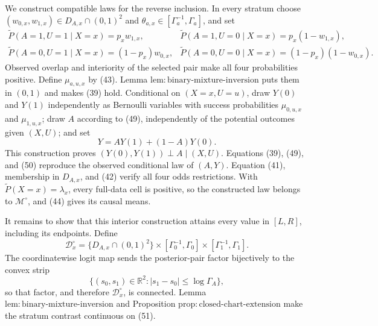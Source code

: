We construct compatible laws for the reverse inclusion.  In every stratum choose \((w_{0,x},w_{1,x})\in D_{A,x}\cap(0,1)^2\) and \(\theta_{a,x}\in[\Gamma_a^{-1},\Gamma_a]\), and set
\[
\begin{array}{ll}
 \widetilde P(A=1,U=1\mid X=x)=p_xw_{1,x},
 &\widetilde P(A=1,U=0\mid X=x)=p_x(1-w_{1,x}),\\
 \widetilde P(A=0,U=1\mid X=x)=(1-p_x)w_{0,x},
 &\widetilde P(A=0,U=0\mid X=x)=(1-p_x)(1-w_{0,x}).
\end{array}                                                             \tag{49}
\]
Observed overlap and interiority of the selected pair make all four probabilities positive.  Define \(\mu_{a,u,x}\) by (43).  Lemma \(\mathrm{lem{:}binary\text{-}mixture\text{-}inversion}\) puts them in \((0,1)\) and makes (39) hold.  Conditional on \((X=x,U=u)\), draw \(Y(0)\) and \(Y(1)\) independently as Bernoulli variables with success probabilities \(\mu_{0,u,x}\) and \(\mu_{1,u,x}\); draw \(A\) according to (49), independently of the potential outcomes given \((X,U)\); and set
\[
 Y=AY(1)+(1-A)Y(0).                                                     \tag{50}
\]
This construction proves \((Y(0),Y(1))\perp A\mid(X,U)\).  Equations (39), (49), and (50) reproduce the observed conditional law of \((A,Y)\).  Equation (41), membership in \(D_{A,x}\), and (42) verify all four odds restrictions.  With \(\widetilde P(X=x)=\lambda_x\), every full-data cell is positive, so the constructed law belongs to \(\mathcal M^{\circ}\), and (44) gives its causal means.

It remains to show that this interior construction attains every value in \([L,R]\), including its endpoints.  Define
\[
 \mathcal D_x^{\circ}
 =\{D_{A,x}\cap(0,1)^2\}
  \times[\Gamma_0^{-1},\Gamma_0]
  \times[\Gamma_1^{-1},\Gamma_1].                                    \tag{51}
\]
The coordinatewise logit map sends the posterior-pair factor bijectively to the convex strip
\[
 \{(s_0,s_1)\in\mathbb R^2:
      |s_1-s_0|\leq\log\Gamma_A\},                                    \tag{52}
\]
so that factor, and therefore \(\mathcal D_x^{\circ}\), is connected.  Lemma \(\mathrm{lem{:}binary\text{-}mixture\text{-}inversion}\) and Proposition \(\mathrm{prop{:}closed\text{-}chart\text{-}extension}\) make the stratum contrast continuous on (51).

